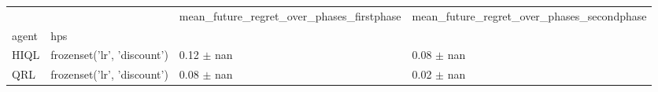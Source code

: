\begin{tabular}{llll}
\toprule
 &  & mean_future_regret_over_phases_firstphase & mean_future_regret_over_phases_secondphase \\
agent & hps &  &  \\
\midrule
HIQL & frozenset({'lr', 'discount'}) & 0.12 $\pm$ nan & 0.08 $\pm$ nan \\
\cline{1-4}
QRL & frozenset({'lr', 'discount'}) & 0.08 $\pm$ nan & 0.02 $\pm$ nan \\
\cline{1-4}
\bottomrule
\end{tabular}

